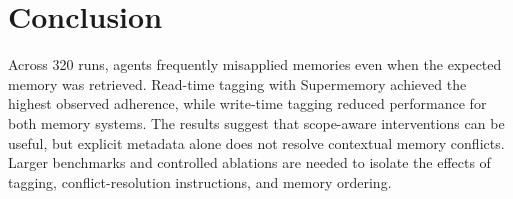 \section{Conclusion}
\label{sec:conclusion}

Across 320 runs, agents frequently misapplied
memories even when the expected memory was retrieved.
Read-time tagging with Supermemory achieved the
highest observed adherence, while write-time
tagging reduced performance for both memory
systems. The results suggest that scope-aware
interventions can be useful, but explicit
metadata alone does not resolve contextual
memory conflicts. Larger benchmarks and
controlled ablations are needed to isolate
the effects of tagging, conflict-resolution
instructions, and memory ordering.

